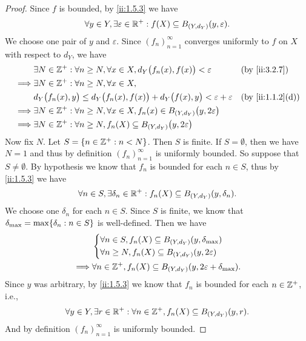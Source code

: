 \begin{proof}
  Since \(f\) is bounded, by \cref{ii:1.5.3} we have
  \[
    \forall y \in Y, \exists \varepsilon \in \mathbb{R}^+ : f(X) \subseteq B_{(Y, d_Y)}(y, \varepsilon).
  \]
  We choose one pair of \(y\) and \(\varepsilon\).
  Since \((f_n)_{n = 1}^\infty\) converges uniformly to \(f\) on \(X\) with respect to \(d_Y\), we have
  \begin{align*}
             & \exists N \in \Z^+ : \forall n \geq N, \forall x \in X, d_Y\big(f_n(x), f(x)\big) < \varepsilon          &  & \by{ii:3.2.7}    \\
    \implies & \exists N \in \Z^+ : \forall n \geq N, \forall x \in X,                                                                        \\
             & d_Y\big(f_n(x), y\big) \leq d_Y\big(f_n(x), f(x)\big) + d_Y\big(f(x), y\big) < \varepsilon + \varepsilon &  & \by{ii:1.1.2}[d] \\
    \implies & \exists N \in \Z^+ : \forall n \geq N, \forall x \in X, f_n(x) \in B_{(Y, d_Y)}\big(y, 2\varepsilon\big)                       \\
    \implies & \exists N \in \Z^+ : \forall n \geq N, f_n(X) \subseteq B_{(Y, d_Y)}\big(y, 2\varepsilon\big)
  \end{align*}
  Now fix \(N\).
  Let \(S = \left\lbrace n \in \mathbb{Z}^+ : n < N\right\rbrace\).
  Then \(S\) is finite.
  If \(S = \emptyset\), then we have \(N = 1\) and thus by definition \((f_n)_{n = 1}^\infty\) is uniformly bounded.
  So suppose that \(S \neq \emptyset\).
  By hypothesis we know that \(f_n\) is bounded for each \(n \in S\), thus by \cref{ii:1.5.3} we have
  \[
    \forall n \in S, \exists \delta_n \in \mathbb{R}^+ : f_n(X) \subseteq B_{(Y, d_Y)}(y, \delta_n).
  \]
  We choose one \(\delta_n\) for each \(n \in S\).
  Since \(S\) is finite, we know that \(\delta_{\max} = \max\set{\delta_n : n \in S}\) is well-defined.
  Then we have
  \begin{align*}
             & \begin{dcases}
                 \forall n \in S, f_n(X) \subseteq B_{(Y, d_Y)}(y, \delta_{\max}) \\
                 \forall n \geq N, f_n(X) \subseteq B_{(Y, d_Y)}(y, 2\varepsilon)
               \end{dcases}                    \\
    \implies & \forall n \in \mathbb{Z}^+, f_n(X) \subseteq B_{(Y, d_Y)}(y, 2\varepsilon + \delta_{\max}).
  \end{align*}
  Since \(y\) was arbitrary, by \cref{ii:1.5.3} we know that \(f_n\) is bounded for each \(n \in \mathbb{Z}^+\), i.e.,
  \[
    \forall y \in Y, \exists r \in \mathbb{R}^+ : \forall n \in \mathbb{Z}^+, f_n(X) \subseteq B_{(Y, d_Y)}(y, r).
  \]
  And by definition \((f_n)_{n = 1}^\infty\) is uniformly bounded.
\end{proof}

